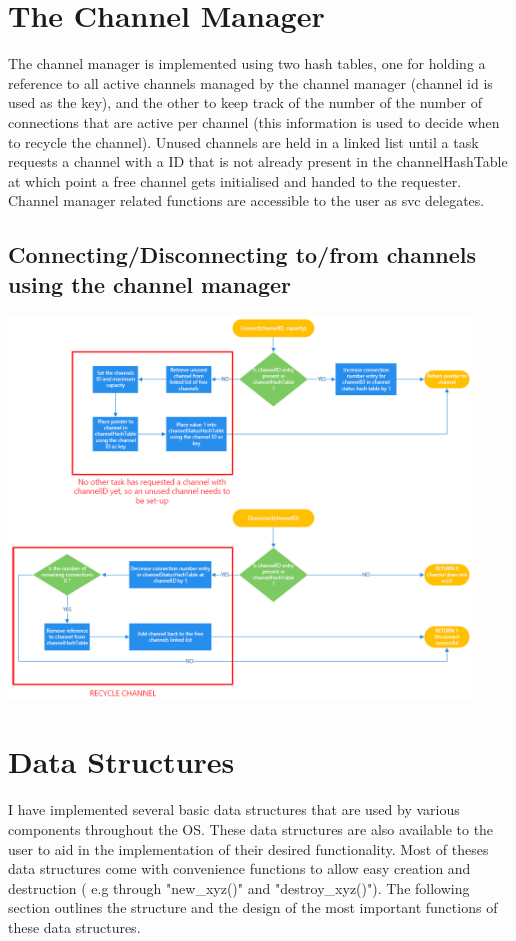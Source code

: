 \documentclass[12pt,a4paper]{article}
\begin{document}
 


\section{The Channel Manager}
The channel manager is implemented using two hash tables, one for holding a reference to all active channels managed by the channel manager (channel id is used as the key), and the other to keep track of the number of the number of connections that are active per channel (this information is used to decide when to recycle the channel). Unused channels are held in a linked list until a task requests a channel with a ID that is not already present in the channelHashTable at which point a free channel gets initialised and handed to the requester. Channel manager related functions are accessible to the user as svc delegates.

\subsection{Connecting/Disconnecting to/from channels using the channel manager}
\includegraphics[width=0.92\textwidth]{images/channelManagerOverview.png}\\

\pagebreak
\section{Data Structures}
I have implemented several basic data structures that are used by various components throughout the OS. These data structures are also available to the user to aid in the implementation of their desired functionality. Most of theses data structures come with convenience functions to allow easy creation  and destruction ( e.g through "new\_xyz()" and "destroy\_xyz()"). The following section outlines the structure and the design of the most important functions of these data structures.
\end{document}
